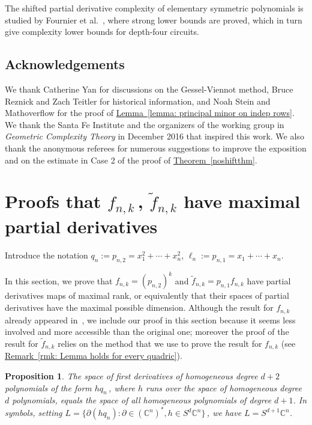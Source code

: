 \documentclass[11pt]{article}
\numberwithin{equation}{section}
\newtheorem{proposition}[theorem]{Proposition}
\theoremstyle{definition}
\theoremstyle{plain}
\newcommand{\expref}[2]{\hyperref[#2]{#1~\ref{#2}}}
\newcommand{\bbC}{\mathbb{C}}
\renewcommand{\tilde}[1]{\widetilde{#1}}
\begin{document}
 The shifted partial derivative complexity of elementary symmetric polynomials is studied by  %
 Fournier et al.~\cite{MR3419496}, where strong lower bounds are proved, which in turn give complexity lower bounds for depth-four circuits.
 
 \subsection*{Acknowledgements} We thank Catherine Yan
%
%
 for discussions on the Gessel-Viennot method, Bruce Reznick and Zach Teitler for historical information, and Noah Stein and Mathoverflow for the proof of \expref{Lemma}{lemma: principal minor on indep rows}. We thank the Santa Fe Institute and the organizers of the working group in \emph{Geometric Complexity Theory} in December 2016 that inspired this work. We also thank the anonymous referees for numerous suggestions to improve the exposition and on the estimate in Case 2 of the proof of \expref{Theorem}{noshiftthm}.


\section{Proofs that \texorpdfstring{$f_{n,k}$\,, $\tilde f_{n,k}$}{f(n,k), tilde f(n,k)} have maximal partial derivatives}\label{easycataproofs}
Introduce the notation $q_n :=p_{n,2} =x_1^2+\cdots + x_n^2$, $\ell_n:= p_{n,1} = x_1 + \cdots + x_n$.

In this section, we prove that $f_{n,k}=(p_{n,2})^k$ and $\tilde{f}_{n,k}=p_{n,1}f_{n,k}$ have partial derivatives maps of maximal rank, or equivalently that their spaces of partial derivatives have the maximal possible dimension. Although the result for $f_{n,k}$ already appeared in~\cite[Thm. 8.15]{MR1096187}, we include our proof in this section because it seems less involved and more accessible than the original one; moreover the proof of the result for $\tilde{f}_{n,k}$ relies on the method that we use to prove the result for $f_{n,k}$ (see \expref{Remark}{rmk: Lemma holds for every quadric}).

 \begin{proposition}\label{prop: hit everything with deg one differentials}
The space of first  derivatives of homogeneous  degree $d+2$ polynomials of the form $h q_n$\,, where $h$ runs over the space of  homogeneous  degree $d$ polynomials,  equals the space of all homogeneous polynomials of degree $d+1$. In symbols, setting $L = \{ \partial ( h q_n  ) : \partial \in (\bbC^n)^*, h \in S^{d} \bbC^n\}$\,, we have $L = S^{d+1} \bbC^n$. 
\end{proposition}
\end{document}
